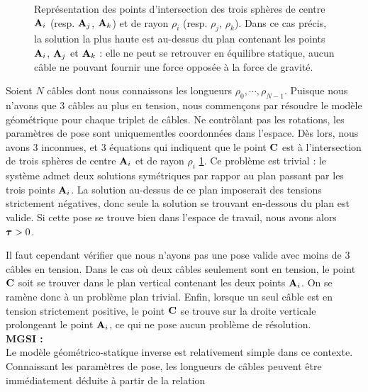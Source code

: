 \begin{figure}[!ht]
  \centering
    \def\svgwidth{.95\linewidth}
      
    \caption{\footnotesize{Repr\'esentation des points d'intersection des 
trois sph\`eres de centre ${\bf A}_i$ (resp. ${\bf A}_j$, ${\bf A}_k$) et de 
rayon $\rho_i$ (resp. $\rho_j$, $\rho_k$). Dans ce cas pr\'ecis, la solution la 
plus haute est au-dessus du plan contenant les points ${\bf A}_i$, ${\bf 
A}_j$ et ${\bf A}_k$ : elle ne peut se retrouver en \'equilibre statique, 
aucun c\^able ne pouvant fournir une force oppos\'ee \`a la force de 
gravit\'e.}}
\label{intro:fig6b}
\end{figure}

Soient $N$ c\^ables dont nous connaissons les longueurs $\rho_0, \cdots, 
\rho_{N-1}$. Puisque nous n'avons que $3$ c\^ables au plus en tension, nous 
commen\c cons par r\'esoudre le mod\`ele g\'eom\'etrique pour chaque 
triplet de c\^ables. Ne contr\^olant pas les rotations, les param\`etres de 
pose sont uniquementles coordonn\'ees dans l'espace. D\`es lors, nous avons $3$ 
inconnues, et $3$ \'equations qui indiquent que le point $\bf C$ est 
à l'intersection de trois sph\`eres de centre ${\bf A}_i$ et de rayon $\rho_i$ 
\ref{intro:fig6b}. Ce problème est trivial : le système admet deux solutions 
symétriques par rappor au plan passant par les trois points ${\bf A}_i$. La 
solution au-dessus de ce plan imposerait des tensions strictement négatives, 
donc seule la solution se trouvant en-dessous du plan est valide. Si cette pose 
se trouve bien dans l'espace de travail, nous avons alors $\hbox{\boldmath $\tau$} > 0$.

Il faut cependant v\'erifier que nous n'ayons pas une pose valide avec moins de 
$3$ c\^ables en tension. Dans le cas où deux câbles seulement sont en tension, 
le point $\bf C$ soit se trouver dans le plan vertical contenant les deux 
points ${\bf A}_i$. On se ramène donc à un problème plan trivial. Enfin, lorsque 
un seul câble est en tension strictement positive, le point ${\bf C}$ se trouve 
sur la droite verticale prolongeant le point ${\bf A}_i$, ce qui ne pose aucun 
problème de résolution.\\

{\bf MGSI :}\\

Le mod\`ele g\'eom\'etrico-statique inverse est relativement simple dans ce 
contexte. Connaissant les param\`etres de pose, les longueurs de c\^ables 
peuvent \^etre imm\'ediatement d\'eduite \`a partir de la relation 

